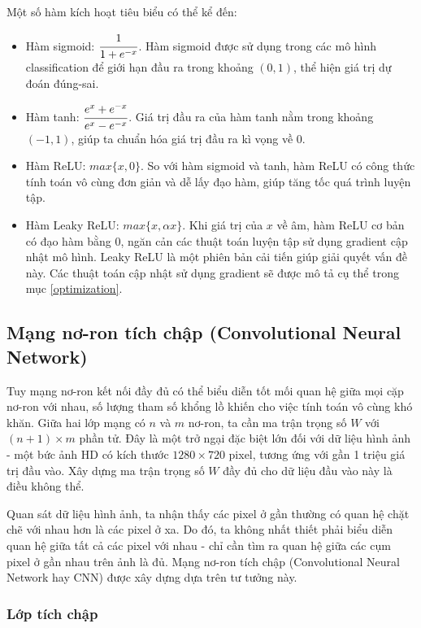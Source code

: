 \documentclass[12pt]{extreport}
\begin{document}
Một số hàm kích hoạt tiêu biểu có thể kể đến:
\begin{itemize}
    \item Hàm sigmoid: $ \cfrac{1}{1 + e^{-x}} $. Hàm sigmoid được sử dụng trong các mô hình classification để giới hạn đầu ra trong khoảng $ (0, 1) $, thể hiện giá trị dự đoán đúng-sai.
    \item Hàm tanh: $ \cfrac{e^{x} + e^{-x}}{e^{x} - e^{-x}} $. Giá trị đầu ra của hàm tanh nằm trong khoảng $ (-1, 1) $, giúp ta chuẩn hóa giá trị đầu ra kì vọng về 0.
    \item Hàm ReLU: $ max\{x, 0\} $. So với hàm sigmoid và tanh, hàm ReLU có công thức tính toán vô cùng đơn giản và dễ lấy đạo hàm, giúp tăng tốc quá trình luyện tập.
    \item Hàm Leaky ReLU: $ max\{x, \alpha x\} $. Khi giá trị của $ x $ về âm, hàm ReLU cơ bản có đạo hàm bằng 0, ngăn cản các thuật toán luyện tập sử dụng gradient cập nhật mô hình. Leaky ReLU là một phiên bản cải tiến giúp giải quyết vấn đề này. Các thuật toán cập nhật sử dụng gradient sẽ được mô tả cụ thể trong mục \ref{optimization}.
\end{itemize}

\subsection{Mạng nơ-ron tích chập (Convolutional Neural Network)}

Tuy mạng nơ-ron kết nối đầy đủ có thể biểu diễn tốt mối quan hệ giữa mọi cặp nơ-ron với nhau, số lượng tham số khổng lồ khiến cho việc tính toán vô cùng khó khăn. Giữa hai lớp mạng có $ n $ và $ m $ nơ-ron, ta cần ma trận trọng số $ W $ với $ (n + 1) \times m $ phần tử. Đây là một trở ngại đặc biệt lớn đối với dữ liệu hình ảnh - một bức ảnh HD có kích thước $ 1280 \times 720 $ pixel, tương ứng với gần 1 triệu giá trị đầu vào. Xây dựng ma trận trọng số $ W $ đầy đủ cho dữ liệu đầu vào này là điều không thể.

Quan sát dữ liệu hình ảnh, ta nhận thấy các pixel ở gần thường có quan hệ chặt chẽ với nhau hơn là các pixel ở xa. Do đó, ta không nhất thiết phải biểu diễn quan hệ giữa tất cả các pixel với nhau - chỉ cần tìm ra quan hệ giữa các cụm pixel ở gần nhau trên ảnh là đủ. Mạng nơ-ron tích chập (Convolutional Neural Network hay CNN) được xây dựng dựa trên tư tưởng này.

\subsubsection{Lớp tích chập}
\label{convolutional-layer}
\end{document}
